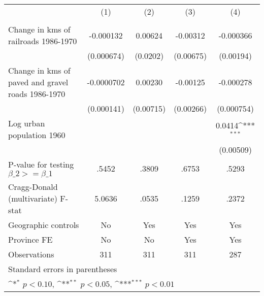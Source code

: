 {
\def\sym#1{\ifmmode^{#1}\else\(^{#1}\)\fi}
\begin{tabular}{l*{4}{c}}
\hline\hline
                &\multicolumn{1}{c}{(1)}&\multicolumn{1}{c}{(2)}&\multicolumn{1}{c}{(3)}&\multicolumn{1}{c}{(4)}\\
                &\multicolumn{1}{c}{}&\multicolumn{1}{c}{}&\multicolumn{1}{c}{}&\multicolumn{1}{c}{}\\
\hline
Change in kms of railroads 1986-1970&-0.000132         &  0.00624         & -0.00312         &-0.000366         \\
                &(0.000674)         & (0.0202)         &(0.00675)         &(0.00194)         \\
[1em]
Change in kms of paved and gravel roads 1986-1970&-0.0000702         &  0.00230         & -0.00125         &-0.000278         \\
                &(0.000141)         &(0.00715)         &(0.00266)         &(0.000754)         \\
[1em]
Log urban population 1960&                  &                  &                  &   0.0414\sym{***}\\
                &                  &                  &                  &(0.00509)         \\
\hline
P-value for testing $\beta\_{2} >= \beta\_{1}$&    .5452         &    .3809         &    .6753         &    .5293         \\
Cragg-Donald (multivariate) F-stat&   5.0636         &    .0535         &    .1259         &    .2372         \\
Geographic controls&       No         &      Yes         &      Yes         &      Yes         \\
Province FE     &       No         &       No         &      Yes         &      Yes         \\
Observations    &      311         &      311         &      311         &      287         \\
\hline\hline
\multicolumn{5}{l}{\footnotesize Standard errors in parentheses}\\
\multicolumn{5}{l}{\footnotesize \sym{*} \(p<0.10\), \sym{**} \(p<0.05\), \sym{***} \(p<0.01\)}\\
\end{tabular}
}
